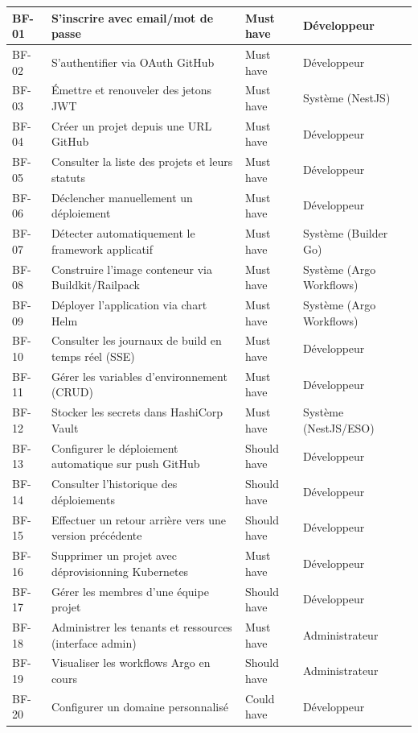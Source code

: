 \begin{longtable}{|p{1.1cm}|p{5.5cm}|p{2cm}|p{3.5cm}|}
BF-01 & S'inscrire avec email/mot de passe & Must have & Développeur \\
\hline
BF-02 & S'authentifier via OAuth GitHub & Must have & Développeur \\
\hline
BF-03 & Émettre et renouveler des jetons JWT & Must have & Système (NestJS) \\
\hline
BF-04 & Créer un projet depuis une URL GitHub & Must have & Développeur \\
\hline
BF-05 & Consulter la liste des projets et leurs statuts & Must have & Développeur \\
\hline
BF-06 & Déclencher manuellement un déploiement & Must have & Développeur \\
\hline
BF-07 & Détecter automatiquement le framework applicatif & Must have & Système (Builder Go) \\
\hline
BF-08 & Construire l'image conteneur via Buildkit/Railpack & Must have & Système (Argo Workflows) \\
\hline
BF-09 & Déployer l'application via chart Helm & Must have & Système (Argo Workflows) \\
\hline
BF-10 & Consulter les journaux de build en temps réel (SSE) & Must have & Développeur \\
\hline
BF-11 & Gérer les variables d'environnement (CRUD) & Must have & Développeur \\
\hline
BF-12 & Stocker les secrets dans HashiCorp Vault & Must have & Système (NestJS/ESO) \\
\hline
BF-13 & Configurer le déploiement automatique sur push GitHub & Should have & Développeur \\
\hline
BF-14 & Consulter l'historique des déploiements & Should have & Développeur \\
\hline
BF-15 & Effectuer un retour arrière vers une version précédente & Should have & Développeur \\
\hline
BF-16 & Supprimer un projet avec déprovisionning Kubernetes & Must have & Développeur \\
\hline
BF-17 & Gérer les membres d'une équipe projet & Should have & Développeur \\
\hline
BF-18 & Administrer les tenants et ressources (interface admin) & Must have & Administrateur \\
\hline
BF-19 & Visualiser les workflows Argo en cours & Should have & Administrateur \\
\hline
BF-20 & Configurer un domaine personnalisé & Could have & Développeur \\
\hline

\end{longtable}


